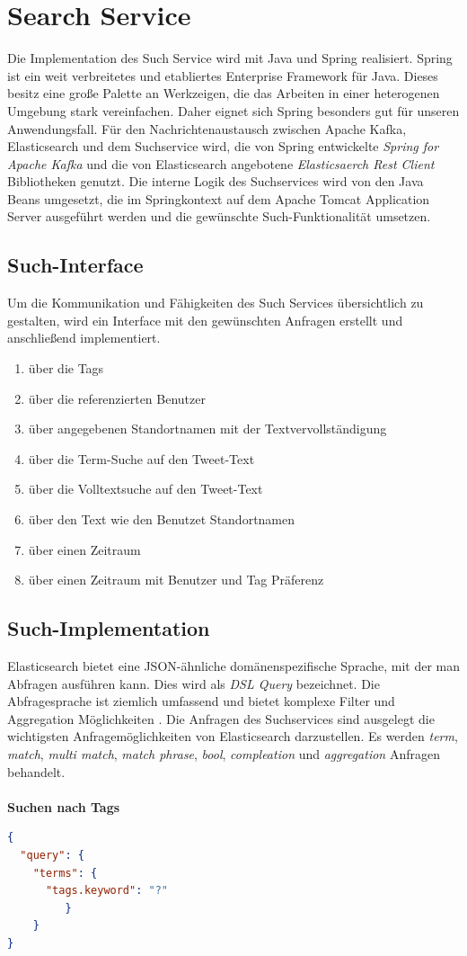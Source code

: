 \section{Search Service}
Die Implementation des Such Service wird mit Java und Spring realisiert. Spring ist ein weit verbreitetes und etabliertes Enterprise Framework für Java. Dieses besitz eine große Palette an Werkzeigen, die das Arbeiten in einer heterogenen Umgebung stark vereinfachen. Daher eignet sich Spring besonders gut für unseren Anwendungsfall. Für den Nachrichtenaustausch zwischen Apache Kafka, Elasticsearch und dem Suchservice wird, die von Spring entwickelte \textit{Spring for Apache Kafka} und die von Elasticsearch angebotene \textit{Elasticsaerch Rest Client} Bibliotheken genutzt.
Die interne Logik des Suchservices wird von den Java Beans umgesetzt, die im Springkontext auf dem Apache Tomcat Application Server ausgeführt werden und die gewünschte Such-Funktionalität umsetzen.

\subsection{Such-Interface}
Um die Kommunikation und Fähigkeiten des Such Services übersichtlich zu gestalten, wird ein Interface mit den gewünschten Anfragen erstellt und anschließend implementiert. 

\begin{enumerate}
  \item über die Tags
  \item über die referenzierten Benutzer
  \item über angegebenen Standortnamen mit der Textvervollständigung
  \item über die Term-Suche auf den Tweet-Text
  \item über die Volltextsuche auf den Tweet-Text
  \item über den Text wie den Benutzet Standortnamen
  \item über einen Zeitraum
  \item über einen Zeitraum mit Benutzer und Tag Präferenz 
\end{enumerate}

\subsection{Such-Implementation}
Elasticsearch bietet eine JSON-ähnliche domänenspezifische Sprache, mit der man Abfragen ausführen kann. Dies wird als \textit{DSL Query} bezeichnet. Die Abfragesprache ist ziemlich umfassend und bietet komplexe Filter und Aggregation Möglichkeiten \cite{elastic-api}. Die Anfragen des Suchservices sind ausgelegt die wichtigsten Anfragemöglichkeiten von Elasticsearch darzustellen. Es werden \textit{term}, \textit{match}, \textit{multi match}, \textit{match phrase}, \textit{bool}, \textit{compleation} und \textit{aggregation} Anfragen behandelt. 
\\\\
\textbf{Suchen nach Tags}
\begin{lstlisting}[language=json,firstnumber=1]
{
  "query": {
    "terms": {
      "tags.keyword": "?"
         }
    }
}
\end{lstlisting}


